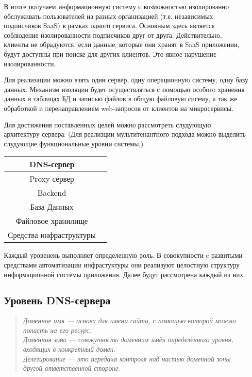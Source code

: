 В итоге получаем информационную систему с возможностью изолированно обслуживать пользователей из разных организацией (т.е. независимых подписчиков SaaS) в рамках одного сервиса. Основным здесь является соблюдение изолированности подписчиков друг от друга. Действительно, клиенты не обрадуются, если данные, которые они хранят в SaaS приложении, будут доступны при поиске для других клиентов. Это явное нарушение изолированности.

Для реализации можно взять один сервер, одну операционную систему, одну базу данных. Механизм изоляции будет осуществляться с помощью особого хранения данных в таблицах БД и записью файлов в общую файловую сисему, а так же обработкой и перенаправлением web-запросов от клиентов на микросервисы.

Для достижения поставленных целей можно рассмотреть слудующую архитектуру сервера:
(Для реализции мультитенантного подхода можно выделить слудующие функциональные уровни системы.)

\begin{center}
	\begin{tabular}[t]{|c|p{15em}|}
		\hline
			DNS-сервер\\
		\hline
			Proxy-сервер\\
		\hline
			Backend\\
		\hline
			База Данных\\
		\hline
			Файловое хранилище\\
		\hline
			Средства инфраструктуры\\
		\hline
	\end{tabular}
\end{center}

Каждый уровенень выполняет определенную роль. В совокупности c развитыми средствами автоматизации инфрастуктуры они реализуют целостную структуру информационной системы приложения. Далее будут рассмотрена каждый из них.

\subsection{Уровень DNS-сервера}

\begin{quote}
\itshape{\large Доменное имя} --- основа для имени сайта, с помощью которой можно попасть на его ресурс.\\
\itshape{\large Доменная зона} --- совокупность доменных имён определённого уровня, входящих в конкретный домен.\\
\itshape{\large Делегирование} --- это передача контроля над частью доменной зоны другой ответственной стороне.
\end{quote}

